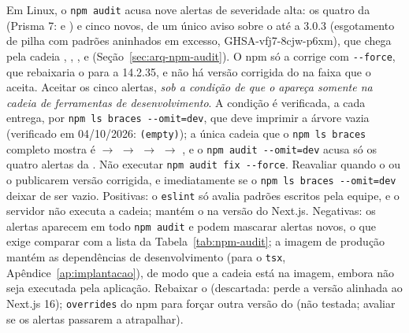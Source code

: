 {Em Linux, o \texttt{npm audit} acusa nove alertas de severidade alta: os quatro da  (Prisma 7:  e ) e cinco novos, de um único aviso sobre o  até a 3.0.3 (esgotamento de pilha com padrões aninhados em excesso, GHSA-vfj7-8cjw-p6xm), que chega pela cadeia , , ,  e  (Seção~\ref{sec:arq-npm-audit}). O npm só a corrige com \texttt{-{}-force}, que rebaixaria o  para a 14.2.35, e não há versão corrigida do  na faixa que o  aceita.}
{Aceitar os cinco alertas, \emph{sob a condição de que o  apareça somente na cadeia de ferramentas de desenvolvimento}. A condição é verificada, a cada entrega, por \texttt{npm ls braces -{}-omit=dev}, que deve imprimir a árvore vazia (verificado em 04/10/2026: \texttt{(empty)}); a única cadeia que o \texttt{npm ls braces} completo mostra é  $\rightarrow$  $\rightarrow$  $\rightarrow$  $\rightarrow$ , e o \texttt{npm audit -{}-omit=dev} acusa só os quatro alertas da . Não executar \texttt{npm audit fix -{}-force}. Reavaliar quando o  ou o  publicarem versão corrigida, e imediatamente se o \texttt{npm ls braces -{}-omit=dev} deixar de ser vazio.}
{Positivas: o \texttt{eslint} só avalia padrões escritos pela equipe, e o servidor não executa a cadeia; mantém o  na versão do Next.js. Negativas: os alertas aparecem em todo \texttt{npm audit} e podem mascarar alertas novos, o que exige comparar com a lista da Tabela~\ref{tab:npm-audit}; a imagem de produção mantém as dependências de desenvolvimento (para o \texttt{tsx}, Apêndice~\ref{ap:implantacao}), de modo que a cadeia está na imagem, embora não seja executada pela aplicação.}
{Rebaixar o  (descartada: perde a versão alinhada ao Next.js 16); \texttt{overrides} do npm para forçar outra versão do  (não testada; avaliar se os alertas passarem a atrapalhar).}

